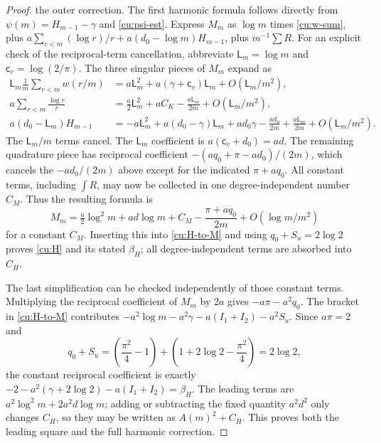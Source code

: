 \begin{proof}
the outer correction. The first harmonic formula follows directly
from $\psi(m)=H_{m-1}-\gamma$ and \eqref{cu:psi-est}.
Express $M_m$ as $\log m$ times \eqref{cu:w-sum}, plus
$a\sum_{r<m}(\log r)/r+a(d_0-\log m)H_{m-1}$, plus $m^{-1}\sum R$.
For an explicit check of the reciprocal-term cancellation, abbreviate
$\mathsf{L}_m=\log m$ and $\mathsf{c}_v=\log(2/\pi)$. The three singular pieces
of $M_m$ expand as
\[
 \begin{aligned}
 \mathsf{L}_m\frac1m\sum_{r<m}w(r/m)
    &=a\mathsf{L}_m^2+a(\gamma+\mathsf{c}_v)\mathsf{L}_m+O(\mathsf{L}_m/m^2),\\
 a\sum_{r<m}\frac{\log r}{r}
    &=\frac a2\mathsf{L}_m^2+aC_K-\frac{a\mathsf{L}_m}{2m}+O(\mathsf{L}_m/m^2),\\
 a(d_0-\mathsf{L}_m)H_{m-1}
    &=-a\mathsf{L}_m^2+a(d_0-\gamma)\mathsf{L}_m+ad_0\gamma
         -\frac{ad_0}{2m}+\frac{a\mathsf{L}_m}{2m}+O(\mathsf{L}_m/m^2).
 \end{aligned}
\]
The $\mathsf{L}_m/m$ terms cancel. The $\mathsf{L}_m$ coefficient is
$a(\mathsf{c}_v+d_0)=ad$. The remaining quadrature piece has reciprocal
coefficient $-(aq_0+\pi-ad_0)/(2m)$, which cancels the
$-ad_0/(2m)$ above except for the indicated $\pi+aq_0$.
All constant terms, including $\int R$, may now be collected in
one degree-independent number $C_M$. Thus the resulting formula is
\[
 M_m=\tfrac a2\log^2m+ad\log m+C_M
          -\frac{\pi+aq_0}{2m}+O(\log m/m^2)
\]
for a constant $C_M$. Inserting this into \eqref{cu:H-to-M} and using
$q_0+S_u=2\log2$ proves \eqref{cu:H} and its stated $\beta_H$;
all degree-independent terms are absorbed into $C_H$.

The last simplification can be checked independently of those
constant terms. Multiplying the reciprocal coefficient of $M_m$
by $2a$ gives $-a\pi-a^2q_0$. The bracket in
\eqref{cu:H-to-M} contributes
$-a^2\log m-a^2\gamma-a(I_1+I_2)-a^2S_u$.
Since $a\pi=2$ and
\[
 q_0+S_u
   =\left(\frac{\pi^2}{4}-1\right)
      +\left(1+2\log2-\frac{\pi^2}{4}\right)
   =2\log2,
\]
the constant reciprocal coefficient is exactly
$-2-a^2(\gamma+2\log2)-a(I_1+I_2)=\beta_H$.
The leading terms are $a^2\log^2m+2a^2d\log m$;
adding or subtracting the fixed quantity $a^2d^2$ only changes
$C_H$, so they may be written as $A(m)^2+C_H$.
This proves both the leading square and the full harmonic correction.


\end{proof}
